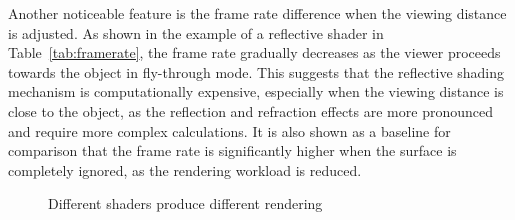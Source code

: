 \documentclass[11pt, twocolumn]{article}
\begin{document}
Another noticeable feature is the frame rate difference when the viewing distance is adjusted. As shown in the example of a reflective shader in Table~\ref{tab:framerate}, the frame rate gradually decreases as the viewer proceeds towards the object in fly-through mode. This suggests that the reflective shading mechanism is computationally expensive, especially when the viewing distance is close to the object, as the reflection and refraction effects are more pronounced and require more complex calculations. It is also shown as a baseline for comparison that the frame rate is significantly higher when the surface is completely ignored, as the rendering workload is reduced.

\begin{figure}[ht]
    \centering
    \caption{Different shaders produce different rendering}
    \label{fig:shaders}
\end{figure}
\end{document}
